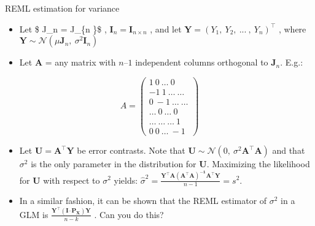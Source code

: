 \documentclass[
  9pt,
  ignorenonframetext,
]{beamer}
\begin{document}
\begin{frame}{REML estimation for variance}
\protect\hypertarget{reml-estimation-for-variance}{}
\begin{itemize}
\item
  Let \$ \pmb J\_n = \pmb J\_\{n \}\$ ,
  \(\pmb I_n = \pmb I_{n \times n}\) , and let
  \(\pmb Y=(Y_1,\ Y_2,\ ...\ ,\ Y_n )^{\top}\) , where
  \(\pmb Y \sim \mathcal N(\mu \pmb J_n,\ \sigma^2 \pmb I_n )\)
\item
  Let \(\pmb A\) = any matrix with \(n–1\) independent columns
  orthogonal to \(\pmb J_n\). E.g.:
\end{itemize}

\[
A = 
\begin{pmatrix}
1\ 0\ \dots\ 0\\ -1\ 1\ \dots\ \dots\\ 0\ -1\ \dots\ \dots\\ \dots\ 0\ \dots\ 0\\ \dots\ \dots\ \dots\ 1\\ 0\ 0\ \dots\ -1
\end{pmatrix}
\]

\begin{itemize}
\item
  Let \(\pmb U= \pmb A^{\top} \pmb Y\) be error contrasts. Note that
  \(\pmb U \sim \mathcal N(0,\ \sigma^2 \pmb {A^{\top} A})\) and that
  \(\sigma^2\) is the only parameter in the distribution for \(\pmb U\).
  Maximizing the likelihood for \(\pmb U\) with respect to \(\sigma^2\)
  yields:
  \(\hat \sigma^2 = \frac {\pmb {Y^{\top} A(A^{\top} A)^{-1} A^{\top} Y}} {n-1}=s^2\).
\item
  In a similar fashion, it can be shown that the REML estimator of
  \(\sigma^2\) in a GLM is \(\frac {\pmb {Y^{\top} (I – P_X)Y}} {n -k}\)
  . Can you do this?
\end{itemize}
\end{frame}
\end{document}
